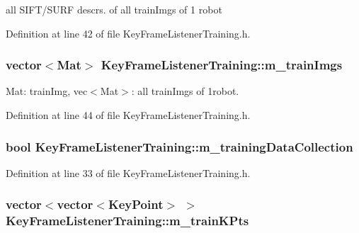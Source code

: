 all \-S\-I\-F\-T/\-S\-U\-R\-F descrs. of all train\-Imgs of 1 robot 



\-Definition at line 42 of file \-Key\-Frame\-Listener\-Training.\-h.

\hypertarget{classKeyFrameListenerTraining_a48bd94c8aaabd896a16fd7bb1557e0e7}{
\subsubsection[{m\-\_\-train\-Imgs}]{\setlength{\rightskip}{0pt plus 5cm}vector$<$\-Mat$>$ {\bf \-Key\-Frame\-Listener\-Training\-::m\-\_\-train\-Imgs}}}\label{classKeyFrameListenerTraining_a48bd94c8aaabd896a16fd7bb1557e0e7}


\-Mat\-: train\-Img, vec$<$\-Mat$>$\-: all train\-Imgs of 1robot. 



\-Definition at line 44 of file \-Key\-Frame\-Listener\-Training.\-h.

\hypertarget{classKeyFrameListenerTraining_a32ea513679de826627bc20c3598bab1b}{
\subsubsection[{m\-\_\-training\-Data\-Collection}]{\setlength{\rightskip}{0pt plus 5cm}bool {\bf \-Key\-Frame\-Listener\-Training\-::m\-\_\-training\-Data\-Collection}}}\label{classKeyFrameListenerTraining_a32ea513679de826627bc20c3598bab1b}


\-Definition at line 33 of file \-Key\-Frame\-Listener\-Training.\-h.

\hypertarget{classKeyFrameListenerTraining_a315dd8f41de6cf586c90f600650a908d}{
\subsubsection[{m\-\_\-train\-K\-Pts}]{\setlength{\rightskip}{0pt plus 5cm}vector$<$vector$<$\-Key\-Point$>$ $>$ {\bf \-Key\-Frame\-Listener\-Training\-::m\-\_\-train\-K\-Pts}}}\label{classKeyFrameListenerTraining_a315dd8f41de6cf586c90f600650a908d}


